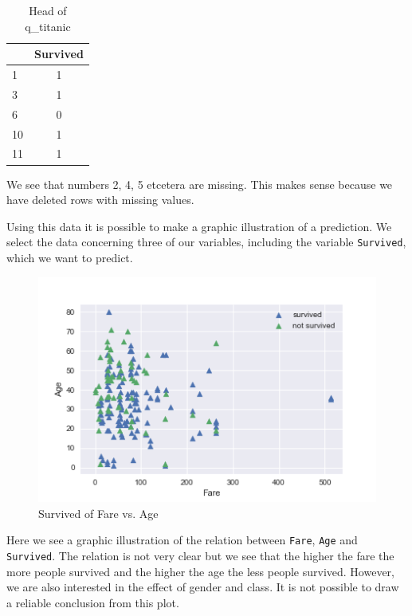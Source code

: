 \documentclass[11pt]{article}
\begin{document}
\begin{table}
\small
\begin{center}
\caption{\label{tab:qtitanichead}Head of q_titanic}
\begin{tabular}{|l|c|}
\toprule
\hline
{} &  Survived \\
\midrule
\hline
1  &         1 \\
3  &         1 \\
6  &         0 \\
10 &         1 \\
11 &         1 \\
\bottomrule
\hline
\end{tabular}
\end{center}
\end{table}

We see that numbers 2, 4, 5 etcetera are missing. This makes sense because we have deleted rows with missing values.

Using this data it is possible to make a graphic illustration of a prediction. We select the data concerning three of our variables, including the variable \texttt{Survived}, which we want to predict. 


\begin{figure}[htbp]
\centering
\includegraphics[width=.9\linewidth]{./survfare.png}
\caption{\label{fig:agefaresurv}
Survived of Fare vs. Age}
\end{figure}



Here we see a graphic illustration of the relation between \texttt{Fare}, \texttt{Age}
and \texttt{Survived}. The relation is not very clear but we see that the higher the fare the more people survived and the higher the age the less people survived. However, we are also interested in the effect of gender and class. It is not possible to draw a reliable conclusion from this plot.
\end{document}
